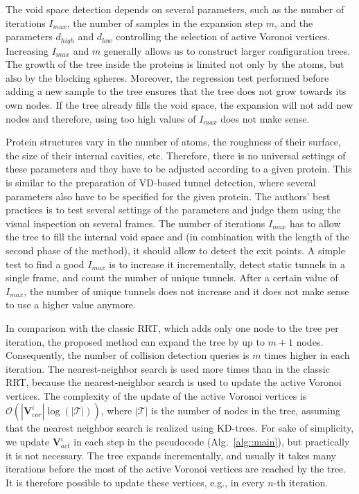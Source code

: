 \documentclass[usletter, 10pt, conference]{svjour3}      %
\def\T{\mathcal{T}}
\def\Imax{I_{max}} %
\def\VV{\mathbf{V}_{vor}}
\def\VVA{\mathbf{V}_{act}}
\def\da{d_{high}}
\def\db{d_{low}}
\begin{document}
The void space detection depends on several parameters, such as the number of iterations $\Imax$, the number of samples in the expansion step $m$, and the parameters $\da$ and $\db$ controlling the selection of active Voronoi vertices.
Increasing $\Imax$ and $m$ generally allows us to construct larger configuration trees.
The growth of the tree inside the proteins is limited not only by the atoms, but also by the blocking spheres.
Moreover, the regression test performed before adding a new sample to the tree ensures that the tree does not grow towards its own nodes.
If the tree already fills the void space, the expansion will not add new nodes and therefore, using too high values of $\Imax$ 
does not make sense.

Protein structures vary in the number of atoms, the roughness of their surface, the size of their internal cavities, etc. 
Therefore, there is no universal settings of these parameters and they have to be adjusted according to a given protein.
This is similar to the preparation of VD-based tunnel detection, where several parameters also have to be specified for the given protein.
The authors' best practices is to test several settings of the parameters and judge them using the visual inspection on several frames.
The number of iterations $\Imax$ has to allow the tree to fill the internal void space and (in combination with the length of the second phase of the method), it should allow to detect the exit points.
A simple test to find a good $\Imax$ is to increase it incrementally, detect static tunnels in a single frame, and count the number of unique tunnels.
After a certain value of $\Imax$, the number of unique tunnels does not increase and it does not make sense to use a higher value anymore.


In comparison with the classic RRT, which adds only one node to the tree per iteration, the proposed method can expand the tree by up to $m+1$ nodes.
Consequently, the number of collision detection queries is $m$ times higher in each iteration.
The nearest-neighbor search is used more times than in the classic RRT, because the nearest-neighbor search is used to update the active Voronoi vertices.
The complexity of the update of the active Voronoi vertices is $\mathcal{O}(|\VV^i|\log(|\T|))$, where $|\T|$ is the number of nodes in the tree, assuming that the nearest neighbor search is realized using KD-trees.
For sake of simplicity, we update $\VVA^i$ in each step in the pseudocode (Alg.~\ref{alg::main}), but practically it is not necessary.
The tree expands incrementally, and usually it takes many iterations before the most of the active Voronoi vertices are reached by the tree.
It is therefore possible to update these vertices, e.g., in every $n$-th iteration. 
\end{document}
